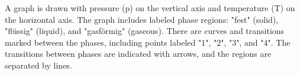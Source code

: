 A graph is drawn with pressure (p) on the vertical axis and temperature (T) on the horizontal axis. The graph includes labeled phase regions: "fest" (solid), "flüssig" (liquid), and "gasförmig" (gaseous). There are curves and transitions marked between the phases, including points labeled "1", "2", "3", and "4". The transitions between phases are indicated with arrows, and the regions are separated by lines.